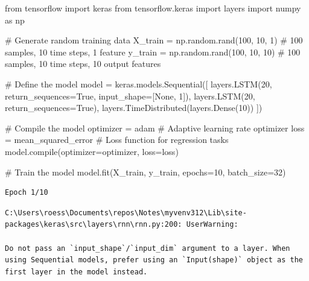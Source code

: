 \documentclass[
  letterpaper,
  DIV=11,
  numbers=noendperiod]{scrreprt}
\newenvironment{Shaded}{\begin{snugshade}}{\end{snugshade}}
\newcommand{\BuiltInTok}[1]{\textcolor[rgb]{0.00,0.23,0.31}{#1}}
\newcommand{\CommentTok}[1]{\textcolor[rgb]{0.37,0.37,0.37}{#1}}
\newcommand{\DecValTok}[1]{\textcolor[rgb]{0.68,0.00,0.00}{#1}}
\newcommand{\ImportTok}[1]{\textcolor[rgb]{0.00,0.46,0.62}{#1}}
\newcommand{\NormalTok}[1]{\textcolor[rgb]{0.00,0.23,0.31}{#1}}
\newcommand{\OperatorTok}[1]{\textcolor[rgb]{0.37,0.37,0.37}{#1}}
\newcommand{\StringTok}[1]{\textcolor[rgb]{0.13,0.47,0.30}{#1}}
\newcommand{\VariableTok}[1]{\textcolor[rgb]{0.07,0.07,0.07}{#1}}
\begin{document}
\begin{Shaded}
\begin{Highlighting}[]
\ImportTok{from}\NormalTok{ tensorflow }\ImportTok{import}\NormalTok{ keras}
\ImportTok{from}\NormalTok{ tensorflow.keras }\ImportTok{import}\NormalTok{ layers}
\ImportTok{import}\NormalTok{ numpy }\ImportTok{as}\NormalTok{ np}

\CommentTok{\# Generate random training data}
\NormalTok{X\_train }\OperatorTok{=}\NormalTok{ np.random.rand(}\DecValTok{100}\NormalTok{, }\DecValTok{10}\NormalTok{, }\DecValTok{1}\NormalTok{)  }\CommentTok{\# 100 samples, 10 time steps, 1 feature}
\NormalTok{y\_train }\OperatorTok{=}\NormalTok{ np.random.rand(}\DecValTok{100}\NormalTok{, }\DecValTok{10}\NormalTok{, }\DecValTok{10}\NormalTok{)  }\CommentTok{\# 100 samples, 10 time steps, 10 output features}

\CommentTok{\# Define the model}
\NormalTok{model }\OperatorTok{=}\NormalTok{ keras.models.Sequential([}
\NormalTok{    layers.LSTM(}\DecValTok{20}\NormalTok{, return\_sequences}\OperatorTok{=}\VariableTok{True}\NormalTok{, input\_shape}\OperatorTok{=}\NormalTok{[}\VariableTok{None}\NormalTok{, }\DecValTok{1}\NormalTok{]),}
\NormalTok{    layers.LSTM(}\DecValTok{20}\NormalTok{, return\_sequences}\OperatorTok{=}\VariableTok{True}\NormalTok{),}
\NormalTok{    layers.TimeDistributed(layers.Dense(}\DecValTok{10}\NormalTok{))}
\NormalTok{])}

\CommentTok{\# Compile the model}
\NormalTok{optimizer }\OperatorTok{=} \StringTok{\textquotesingle{}adam\textquotesingle{}}  \CommentTok{\# Adaptive learning rate optimizer}
\NormalTok{loss }\OperatorTok{=} \StringTok{\textquotesingle{}mean\_squared\_error\textquotesingle{}}  \CommentTok{\# Loss function for regression tasks}
\NormalTok{model.}\BuiltInTok{compile}\NormalTok{(optimizer}\OperatorTok{=}\NormalTok{optimizer, loss}\OperatorTok{=}\NormalTok{loss)}

\CommentTok{\# Train the model}
\NormalTok{model.fit(X\_train, y\_train, epochs}\OperatorTok{=}\DecValTok{10}\NormalTok{, batch\_size}\OperatorTok{=}\DecValTok{32}\NormalTok{)}
\end{Highlighting}
\end{Shaded}

\begin{verbatim}
Epoch 1/10
\end{verbatim}

\begin{verbatim}
C:\Users\roess\Documents\repos\Notes\myvenv312\Lib\site-packages\keras\src\layers\rnn\rnn.py:200: UserWarning:

Do not pass an `input_shape`/`input_dim` argument to a layer. When using Sequential models, prefer using an `Input(shape)` object as the first layer in the model instead.
\end{verbatim}
\end{document}
